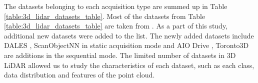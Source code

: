     The datasets belonging to each acquisition type are summed up in  Table \ref{table:3d_lidar_datasets_table}.
    Most of the datasets from Table \ref{table:3d_lidar_datasets_table} are taken from \cite{survey3d}. As a part of this study, additional new datasets were added to the list.
    The newly added datasets include DALES \cite{varney2020dales}, ScanObjectNN \cite{scanobejctnn} in static acquisition mode and AIO Drive \cite{Weng2020_AIODrive}, Toronto3D \cite{tan2020toronto3d} are additions in the sequential mode.
    The limited number of datasets in 3D LiDAR allowed us to study the characteristics of each dataset, such as each class, data distribution and features of the point cloud. 
    
